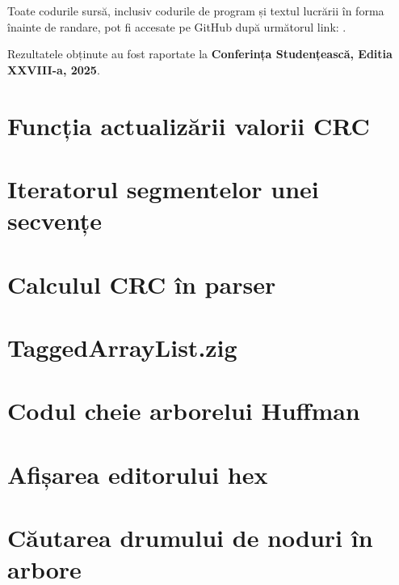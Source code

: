 \documentclass[a4paper,12pt]{report}
\renewcommand{\year}{2025}
\newcommand{\conferencesList}{Conferința Studențească, Editia XXVIII-a, \year}
\newcommand{\github}{\url{                           }}
\begin{document}
Toate codurile sursă, inclusiv codurile de program și textul lucrării
în forma înainte de randare, pot fi accesate pe GitHub după următorul link: \github.

Rezultatele obținute au fost raportate la \textbf{\conferencesList}\cite{self}.

\newpage
{}





\appendix


\section{Funcția actualizării valorii CRC}\label{appendix:crc} %


\section{Iteratorul segmentelor unei secvențe}\label{appendix:sequence_iterator} %


\section{Calculul CRC în parser}\label{appendix:crc_sequence_defer_example} %



\section{TaggedArrayList.zig}\label{appendix:main__TaggedArrayList} %

\section{Codul cheie arborelui Huffman}\label{appendix:huffman_tree}%



\section{Afișarea editorului hex}\label{appendix:draw_hex_grid}%


\section{Căutarea drumului de noduri în arbore}\label{appendix:node_path_search_impl}%
\end{document}
